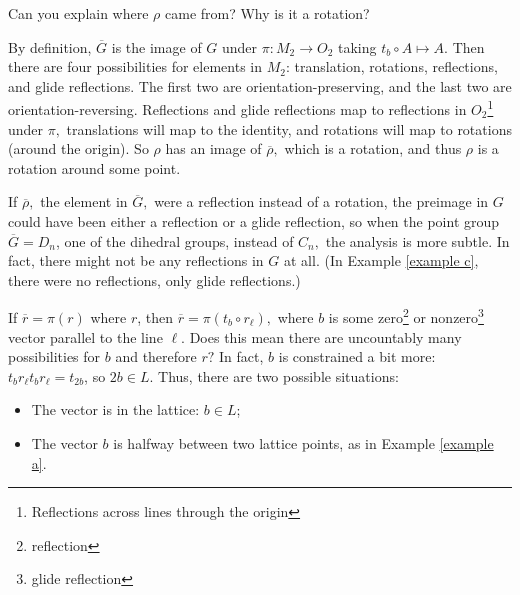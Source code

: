 \begin{question}
Can you explain where $\rho$ came from? Why is it a rotation? 
\end{question}

\begin{ans}
By definition, $\overline{G}$ is the image of $G$ under $\pi: M_2 \rightarrow O_2$ taking $t_b \circ A \mapsto A.$ Then there are four possibilities for elements in $M_2$: translation, rotations, reflections, and glide reflections. The first two are orientation-preserving, and the last two are orientation-reversing. Reflections and glide reflections map to reflections in $O_2$\footnote{Reflections across lines through the origin} under $\pi,$ translations will map to the identity, and rotations will map to rotations (around the origin). So $\rho$ has an image of $\overline{\rho},$ which is a rotation, and thus $\rho$ is a rotation around some point.
\end{ans}

If $\overline{\rho},$ the element in $\overline{G},$ were a reflection instead of a rotation, the preimage in $G$ could have been either a reflection or a glide reflection, so when the point group $\overline{G} = D_n$, one of the dihedral groups, instead of $C_n,$ the analysis is more subtle. In fact, there might not be any reflections in $G$ at all. (In Example \ref{example c}, there were no reflections, only glide reflections.) 


\begin{example}

If $\overline{r} = \pi(r)$ where $r$, then $\overline{r} = \pi(t_b \circ r_\ell),$ where $b$ is some zero\footnote{reflection} or nonzero\footnote{glide reflection} vector parallel to the line $\ell$. Does this mean there are uncountably many possibilities for $b$ and therefore $r?$ In fact, $b$ is constrained a bit more: $t_b r_\ell t_b r_\ell = t_{2b}$, so $2b \in L$. Thus, there are two possible situations: 
\begin{itemize}
    \item The vector is in the lattice: $b \in L$;
    \item The vector $b$ is halfway between two lattice points, as in Example \ref{example a}.
\end{itemize}
\end{example}

